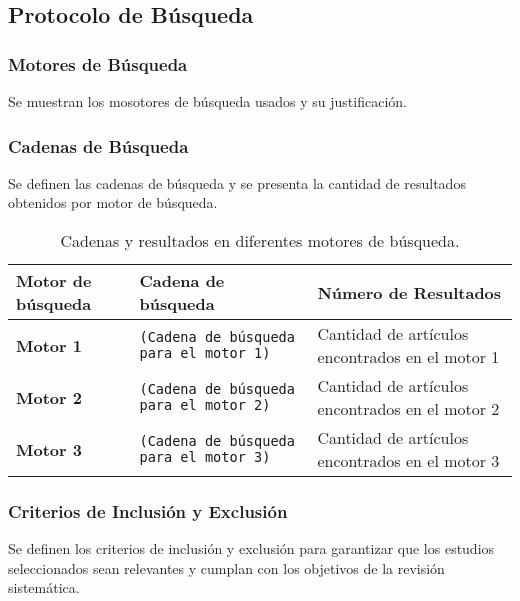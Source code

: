 \subsection{Protocolo de Búsqueda}
\label{subsec:protocolo-busqueda}

\subsubsection{Motores de Búsqueda}
\label{subsubsec:motor-busqueda}

Se muestran los mosotores de búsqueda usados y su justificación.

\subsubsection{Cadenas de Búsqueda}
\label{subsubsec:cadenas-busqueda}

Se definen las cadenas de búsqueda y se presenta la cantidad de resultados obtenidos
por motor de búsqueda.

\begin{table}[h!]
      \centering
      \begin{tabular}{|p{2cm}|p{10cm}|p{2.5cm}|}
            \hline
            \textbf{Motor de búsqueda} & \textbf{Cadena de búsqueda}                   & \textbf{Número de Resultados}                   \\ \hline
            \textbf{Motor 1}           & \texttt{(Cadena de búsqueda para el motor 1)} & Cantidad de artículos encontrados en el motor 1 \\ \hline
            \textbf{Motor 2}           & \texttt{(Cadena de búsqueda para el motor 2)} & Cantidad de artículos encontrados en el motor 2 \\ \hline
            \textbf{Motor 3}           & \texttt{(Cadena de búsqueda para el motor 3)} & Cantidad de artículos encontrados en el motor 3 \\ \hline
      \end{tabular}
      \caption{Cadenas y resultados en diferentes motores de búsqueda.}
      \label{tab:search-results}
\end{table}

\subsubsection{Criterios de Inclusión y Exclusión}
\label{subsubsec:criterios-inclusion-exclusion}

Se definen los criterios de inclusión y exclusión para garantizar que los estudios seleccionados sean relevantes y
cumplan con los objetivos de la revisión sistemática.

